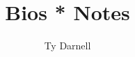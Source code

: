 \documentclass[openany]{book}
\title{Bios * Notes}
\author{Ty Darnell}
\date{ }
\numberwithin{equation}{section}
\begin{document}
\tableofcontents
\begin{flushleft}

	
	
\end{flushleft}
\end{document}
